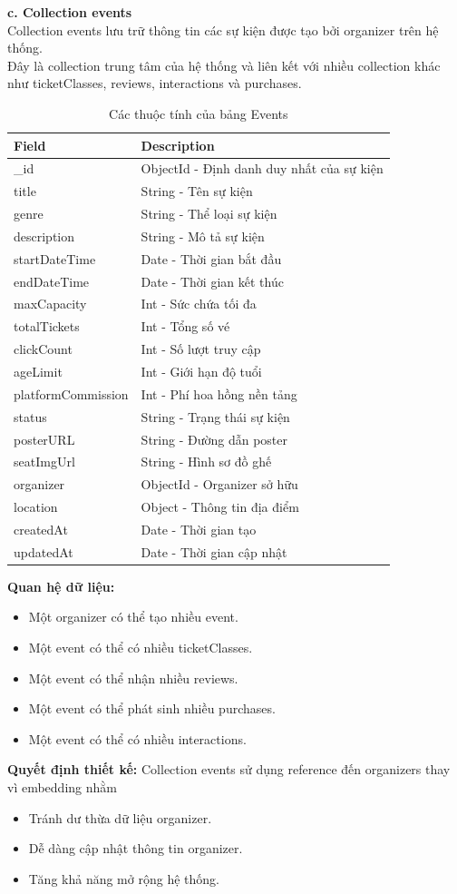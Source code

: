 \textbf{c. Collection events}\\
Collection events lưu trữ thông tin các sự kiện được tạo bởi organizer trên hệ thống.\\
Đây là collection trung tâm của hệ thống và liên kết với nhiều collection khác như ticketClasses, reviews, interactions và purchases.
\setlength{\LTleft}{0pt}
\setlength{\LTright}{0pt}
\begin{longtable}{|p{4cm}|p{11.2cm}|}
\caption{Các thuộc tính của bảng Events}\\[15pt]
\hline
\textbf{Field} & \textbf{Description} \\ \hline
\_id & ObjectId - Định danh duy nhất của sự kiện \\ \hline
title & String - Tên sự kiện \\ \hline
genre & String - Thể loại sự kiện \\ \hline
description & String - Mô tả sự kiện \\ \hline
startDateTime & Date - Thời gian bắt đầu \\ \hline
endDateTime & Date - Thời gian kết thúc \\ \hline
maxCapacity & Int - Sức chứa tối đa \\ \hline
totalTickets & Int - Tổng số vé \\ \hline
clickCount & Int - Số lượt truy cập \\ \hline
ageLimit & Int - Giới hạn độ tuổi \\ \hline
platformCommission & Int - Phí hoa hồng nền tảng \\ \hline
status & String - Trạng thái sự kiện \\ \hline
posterURL & String - Đường dẫn poster \\ \hline
seatImgUrl & String - Hình sơ đồ ghế \\ \hline
organizer & ObjectId - Organizer sở hữu \\ \hline
location & Object - Thông tin địa điểm \\ \hline
createdAt & Date - Thời gian tạo \\ \hline
updatedAt & Date - Thời gian cập nhật \\ \hline
\end{longtable}
\textbf{Quan hệ dữ liệu:}
\begin{itemize}
    \item[-] Một organizer có thể tạo nhiều event.
    \item[-] Một event có thể có nhiều ticketClasses.
    \item[-] Một event có thể nhận nhiều reviews.
    \item[-] Một event có thể phát sinh nhiều purchases.
    \item[-] Một event có thể có nhiều interactions.
\end{itemize}
\textbf{Quyết định thiết kế:} Collection events sử dụng reference đến organizers thay vì embedding nhằm
\begin{itemize}
    \item[-] Tránh dư thừa dữ liệu organizer.
    \item[-] Dễ dàng cập nhật thông tin organizer.
    \item[-] Tăng khả năng mở rộng hệ thống.
\end{itemize}


